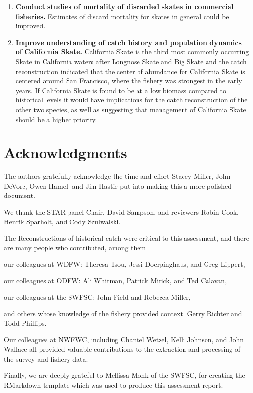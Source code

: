 \documentclass[]{article}
\begin{document}
\begin{enumerate}
\item \textbf{Conduct studies of mortality of discarded skates in commercial fisheries.} Estimates of discard mortality for skates in general could be improved.

\item \textbf{Improve understanding of catch history and population dynamics of California Skate.} California Skate is the third most commonly occurring Skate in California waters after Longnose Skate and Big Skate and the catch reconstruction indicated that the center of abundance for California Skate is centered around San Francisco, where the fishery was strongest in the early years. If California Skate is found to be at a low biomass compared to historical levels it would have implications for the catch reconstruction of the other two species, as well as suggesting that management of California Skate should be a higher priority.

\end{enumerate}

\hypertarget{acknowledgments}{%
\section{Acknowledgments}\label{acknowledgments}}

The authors gratefully acknowledge the time and effort Stacey Miller,
John DeVore, Owen Hamel, and Jim Hastie put into making this a more
polished document.

We thank the STAR panel Chair, David Sampson, and reviewers Robin Cook,
Henrik Sparholt, and Cody Szulwalski.

The Reconstructions of historical catch were critical to this
assessment, and there are many people who contributed, among them

our colleagues at WDFW: Theresa Tsou, Jessi Doerpinghaus, and Greg
Lippert,

our colleagues at ODFW: Ali Whitman, Patrick Mirick, and Ted Calavan,

our colleagues at the SWFSC: John Field and Rebecca Miller,

and others whose knowledge of the fishery provided context: Gerry
Richter and Todd Phillips.

Our colleagues at NWFWC, including Chantel Wetzel, Kelli Johnson, and
John Wallace all provided valuable contributions to the extraction and
processing of the survey and fishery data.

Finally, we are deeply grateful to Mellissa Monk of the SWFSC, for
creating the RMarkdown template which was used to produce this
assessment report.

\newpage
\FloatBarrier
\end{document}
